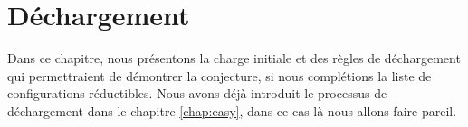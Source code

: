 \documentclass[10pt,a4paper]{article}
\newtheorem{definition}{Définition}
\newtheorem{theorem}{Théorème}
\begin{document}
%
%
%
%
%



\section{Déchargement}
\label{chap:Dec}
Dans ce chapitre, nous présentons la charge initiale et des règles de déchargement qui permettraient de démontrer la conjecture, si nous complétions la liste de configurations réductibles.
Nous avons déjà introduit le processus de déchargement dans le chapitre \ref{chap:easy}, dans ce cas-là nous allons faire pareil.
\end{document}
